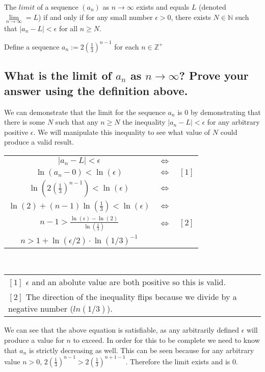 \begin{definition}
The $limit$ of a sequence $(a_n)$ as $n \rightarrow \infty$ exists and equals $L$ (denoted $\lim\limits_{n \rightarrow \infty} = L$) if and only if for any small number $\epsilon > 0$, there exists $N \in \mathbb{N}$ such that $|a_n - L| < \epsilon$ for all $n \geq N$.
\end{definition}
Define a sequence $a_n := 2(\frac{1}{3})^{n-1}$ for each $n \in \mathbb{Z}^+$

\subsection{What is the limit of $a_n$ as $n \rightarrow \infty$? Prove your answer using the definition above.}
We can demonstrate that the limit for the sequence $a_n$ is $0$ by demonstrating that there is some $N$ such that any $n \geq N$ the inequality $|a_n - L| < \epsilon$ for any arbitrary positive $\epsilon$. We will manipulate this inequality to see what value of $N$ could produce a valid result.

\begin{center}
  \begin{tabular}{ccc}
    $|a_n - L| < \epsilon$ & $\iff$ \\
    $\ln(a_n - 0) < \ln(\epsilon)$ & $\iff$ & $[1]$ \\
    $\ln(2(\frac{1}{3})^{n-1}) < \ln(\epsilon)$ & $\iff$ \\
    $\ln(2) + (n-1)\ln(\frac{1}{3}) < \ln(\epsilon)$ & $\iff$ \\
    $n - 1 > \frac{\ln(\epsilon) - \ln(2)}{\ln(\frac{1}{3})}$ & $\iff$ & $[2]$ \\
    $n > 1 + \ln(\epsilon/2) \cdot \ln(1/3)^{-1}$

  \end{tabular} \\
  \begin{tabular}{l}
  $[1]$ $\epsilon$ and an abolute value are both positive so this is valid. \\
  $[2]$ The direction of the inequality flips because we divide by a negative number ($ln(1/3)$).
  \end{tabular}
\end{center}

We can see that the above equation is satisfiable, as any arbitrarily defined $\epsilon$ will produce a value for $n$ to exceed. In order for this to be complete we need to know that $a_n$ is strictly decreasing as well. This can be seen because for any arbitrary value $n > 0$, $2(\frac{1}{3})^{n-1} > 2(\frac{1}{3})^{n+1-1}$. Therefore the limit exists and is 0.


